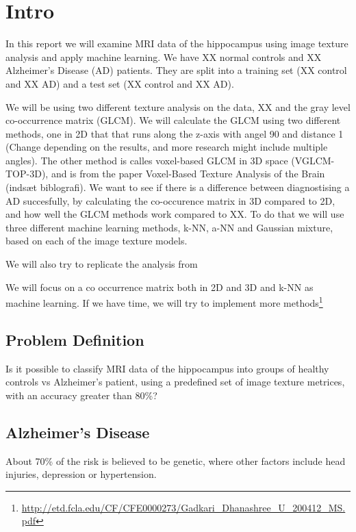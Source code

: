 \chapter{Intro}

In this report we will examine MRI data of the hippocampus using image texture analysis and apply machine learning. We have XX normal controls and XX Alzheimer's Disease (AD) patients. They are split into a training set (XX control and XX AD) and a test set (XX control and XX AD).

We will be using two different texture analysis on the data, XX and the gray level co-occ\-urren\-ce matrix (GLCM).
We will calculate the GLCM using two different methods, one in 2D that that runs along the z-axis with angel 90 and distance 1 (Change depending on the results, and more research might include multiple angles).\cite{Castellano}
The other method is calles voxel-based GLCM in 3D space (VGLCM-TOP-3D), and is from the paper Voxel-Based Texture Analysis of the Brain (indsæt biblografi).
We want to see if there is a difference between diagnostising a AD succesfully, by calculating the co-occurence matrix in 3D compared to 2D, and how well the GLCM methods work
compared to XX. To do that we will use three different machine learning methods, k-NN, a-NN and Gaussian mixture, based on each of the image texture models.

We will also try to replicate the analysis from \cite{MRfreeborough}

We will focus on a co occurrence matrix both in 2D and 3D and k-NN as machine learning. If we have time, we will try to implement more methods\footnote{\url{http://etd.fcla.edu/CF/CFE0000273/Gadkari_Dhanashree_U_200412_MS.pdf}}

\section{Problem Definition}

Is it possible to classify MRI data of the hippocampus into groups of healthy controls vs Alzheimer's patient, using a predefined set of image texture metrices, with an accuracy great\-er than 80\%?

\section{Alzheimer's Disease}

About 70\% of the risk is believed to be genetic, where other factors include head injuries, depression or hypertension. \cite{Magnetic}

